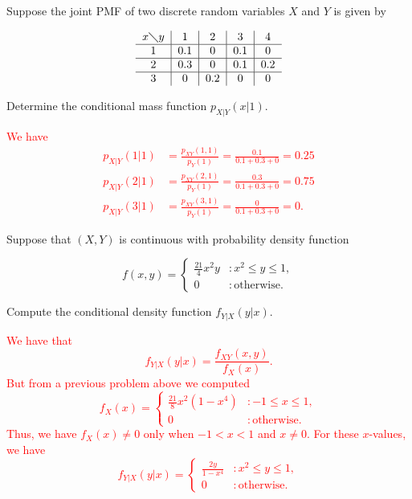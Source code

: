 \documentclass[12pt,reqno]{amsart}
\begin{document}
\prob Suppose the joint PMF of two discrete random variables $X$ and $Y$ is given by

	\[
	\begin{tabular}{c|c|c|c|c}
	$x \diagdown y$ & 1 & 2 & 3 & 4 \\ \hline 
	1 & 0.1 & 0 & 0.1 & 0\\ \hline
	2 & 0.3 & 0 & 0.1 & 0.2 \\ \hline
	3 & 0 & 0.2 & 0 & 0
	\end{tabular}
	\]

Determine the conditional mass function $p_{X|Y}(x|1)$.

\bigskip
\textcolor{red}{We have
	\begin{align*}
	p_{X|Y}(1|1) &= \frac{p_{XY}(1,1)}{p_Y(1)} = \frac{0.1}{0.1+0.3+0} = 0.25 \\
	p_{X|Y}(2|1) &= \frac{p_{XY}(2,1)}{p_Y(1)} = \frac{0.3}{0.1+0.3+0} = 0.75 \\
	p_{X|Y}(3|1) &= \frac{p_{XY}(3,1)}{p_Y(1)} = \frac{0}{0.1+0.3+0} = 0.
	\end{align*}}
\bigskip














\prob Suppose that $(X,Y)$ is continuous with probability density function

	\[
	f(x,y) = \begin{cases}
	\frac{21}{4}x^2 y & : x^2 \leq y \leq 1, \\
	0 & : \text{otherwise}.
	\end{cases}
	\]

Compute the conditional density function $f_{Y|X}(y|x)$.

\bigskip
\textcolor{red}{We have that
	\[
	f_{Y|X}(y|x) = \frac{f_{XY}(x,y)}{f_X(x)}.
	\]
But from a previous problem above we computed
	\[
	f_X(x) = \begin{cases}
	\frac{21}{8}x^2(1-x^4) & : -1\leq x \leq 1, \\
	0 & : \text{otherwise}.
	\end{cases}
	\]
Thus, we have $f_X(x)\neq 0$ only when $-1 < x < 1$ and $x\neq 0$. For these $x$-values, we have
	\[
	f_{Y|X}(y|x) = \begin{cases}
	\frac{2y}{1-x^4} & : x^2 \leq y \leq 1, \\
	0 & : \text{otherwise}.
	\end{cases}
	\]}
\bigskip
\end{document}
